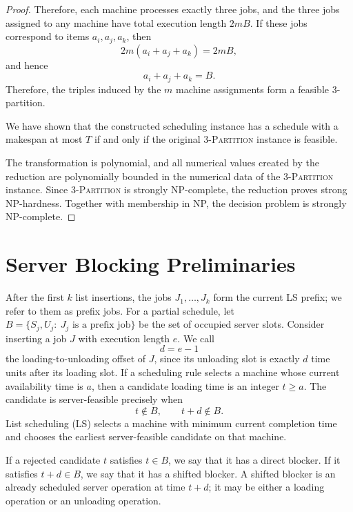 \documentclass[11pt]{article}
\begin{document}
\begin{proof}
Therefore, each machine processes exactly three jobs, and the three jobs assigned
to any machine have total execution length \(2mB\). If these jobs correspond to
items \(a_i,a_j,a_k\), then
\[
        2m(a_i+a_j+a_k)=2mB,
\]
and hence
\[
        a_i+a_j+a_k=B.
\]
Therefore, the triples induced by the \(m\) machine assignments form a feasible
3-partition.

We have shown that the constructed scheduling instance has a schedule with a 
makespan at most \(T\) if and only if the original \textsc{3-Partition} instance
is feasible.

The transformation is polynomial, and all numerical values created by the
reduction are polynomially bounded in the numerical data of the
\textsc{3-Partition} instance. Since \textsc{3-Partition} is strongly
NP-complete, the reduction proves strong NP-hardness. Together with membership
in NP, the decision problem is strongly NP-complete.
\end{proof}



\section{Server Blocking Preliminaries}
\label{sec:server-blocking-preliminaries}

After the first \(k\) list insertions, the jobs
\(J_1,\ldots,J_k\) form the current LS prefix; we refer to them as prefix jobs.
For a partial schedule, let
$B=\{S_j,U_j:\ J_j \text{ is a prefix job}\}$
be the set of occupied server slots. Consider inserting a job \(J\) with
execution length \(e\). We call
\[
        d=e-1
\]
the loading-to-unloading offset of \(J\), since its unloading slot is exactly
\(d\) time units after its loading slot.
If a scheduling rule selects a machine whose current availability time is \(a\),
then a candidate loading time is an integer \(t\ge a\). The candidate is
server-feasible precisely when
\[
        t\notin B,
        \qquad
        t+d\notin B.
\]
List scheduling (LS) selects a machine with minimum current completion time and
chooses the earliest server-feasible candidate on that machine.

If a rejected candidate \(t\) satisfies \(t\in B\), we say that it has a
direct blocker. If it satisfies \(t+d\in B\), we say that it has a shifted
blocker. A shifted blocker is an already scheduled server operation at time
\(t+d\); it may be either a loading operation or an unloading operation.
\end{document}
